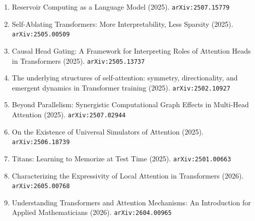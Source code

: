 \documentclass[11pt]{article}
\begin{document}
\begin{enumerate}
  \item Reservoir Computing as a Language Model (2025). \texttt{arXiv:2507.15779}
  \item Self-Ablating Transformers: More Interpretability, Less Sparsity (2025). \texttt{arXiv:2505.00509}
  \item Causal Head Gating: A Framework for Interpreting Roles of Attention Heads in Transformers (2025). \texttt{arXiv:2505.13737}
  \item The underlying structures of self-attention: symmetry, directionality, and emergent dynamics in Transformer training (2025). \texttt{arXiv:2502.10927}
  \item Beyond Parallelism: Synergistic Computational Graph Effects in Multi-Head Attention (2025). \texttt{arXiv:2507.02944}
  \item On the Existence of Universal Simulators of Attention (2025). \texttt{arXiv:2506.18739}
  \item Titans: Learning to Memorize at Test Time (2025). \texttt{arXiv:2501.00663}
  \item Characterizing the Expressivity of Local Attention in Transformers (2026). \texttt{arXiv:2605.00768}
  \item Understanding Transformers and Attention Mechanisms: An Introduction for Applied Mathematicians (2026). \texttt{arXiv:2604.00965}
\end{enumerate}
\end{document}
